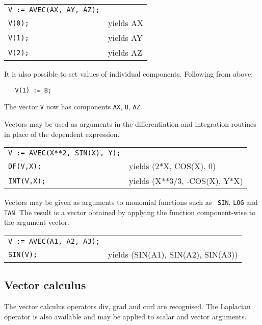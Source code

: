 \begin{tabular}{l l}
{\tt V := AVEC(AX, AY, AZ);} & \\
{\tt V(0);} & yields AX \\
{\tt V(1);} & yields AY \\
{\tt V(2);} & yields AZ \\
\end{tabular}

It is also possible to set values of individual components. Following
from above:
\begin{verbatim}
   V(1) := B;
\end{verbatim}
The vector {\tt V} now has components {\tt AX}, {\tt B}, {\tt AZ}.

 
 
Vectors may be used as arguments in the differentiation and
integration routines in place of the dependent expression.

\begin{tabular}{l l}
{\tt V := AVEC(X**2, SIN(X), Y);} & \\
{\tt DF(V,X);} & yields (2*X, COS(X), 0) \\
{\tt INT(V,X);} & yields (X**3/3, -COS(X), Y*X) \\
\end{tabular}

Vectors may be given as arguments to monomial functions such as {\tt
SIN}, {\tt LOG} and {\tt TAN}. The result is a vector obtained by
applying the function component-wise to the argument vector.

\begin{tabular}{l l}
{\tt V := AVEC(A1, A2, A3);} & \\
{\tt SIN(V);} & yields (SIN(A1), SIN(A2), SIN(A3)) \\
\end{tabular}

\subsection{ Vector calculus}

 
 
 
 
The vector calculus operators div, grad and curl are recognised.
The Laplacian operator is also available and may be applied to
scalar and vector arguments.

